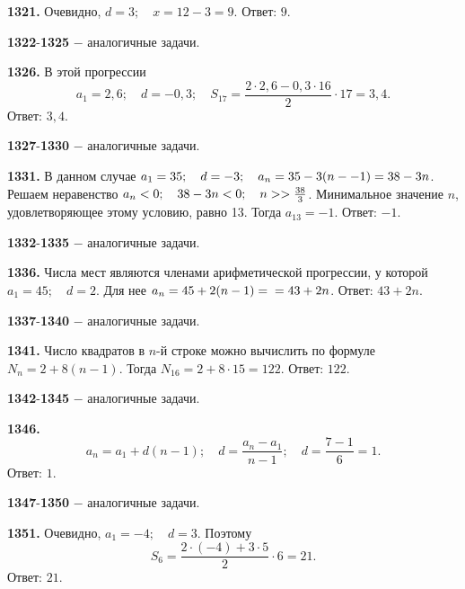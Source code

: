 \textbf{1321.} Очевидно, $d=3;\quad x=12-3=9$. \newline \null \hspace*{\fill} Ответ: $9$. 

\textbf{1322}-\textbf{1325} $-$ аналогичные задачи.

\textbf{1326.} В этой прогрессии $$a_1=2,6;\quad d=-0,3;\quad S_{17}=\frac{2\cdot2,6-0,3\cdot16}{2}\cdot17=3,4.$$ \newline \null \hspace*{\fill} Ответ: $3,4$. 

\textbf{1327}-\textbf{1330} $-$ аналогичные задачи.

\textbf{1331.} В данном случае $a_1=35;\quad d=-3;\quad a_n=35-3(n-\linebreak-1)=38-3n$. Решаем неравенство $a_n<0;\quad38-3n<0;\quad n>\linebreak>\frac{38}{3}$.  Минимальное 
значение $n$, удовлетворяющее этому условию, равно 13. Тогда $a_{13}=-1$. \newline \null \hspace*{\fill} Ответ: $-1$. 

\textbf{1332}-\textbf{1335} $-$ аналогичные задачи.

\textbf{1336.} Числа мест являются членами арифметической прогрессии, у которой $a_1=45;\quad d=2$. Для нее $a_n=45+2(n-1)=\newline=43+2n$. \newline \null \hspace*{\fill} Ответ: $43+2n$. 

\textbf{1337}-\textbf{1340} $-$ аналогичные задачи.

\textbf{1341.}  Число квадратов в  $n$-й строке можно вычислить по формуле $N_n=2+8(n-1)$. Тогда $N_{16}=2+8\cdot15=122$. \newline \null \hspace*{\fill} Ответ: $122$.

\textbf{1342}-\textbf{1345} $-$ аналогичные задачи.

\newpage \textbf{1346.} $$a_n=a_1+d(n-1);\quad d=\frac{a_n-a_1}{n-1};\quad d=\frac{7-1}{6}=1.$$ \newline \null \hspace*{\fill} Ответ: $1$.

\textbf{1347}-\textbf{1350} $-$ аналогичные задачи.

\textbf{1351.} Очевидно, $a_1=-4;\quad d=3$. Поэтому $$S_6=\frac{2\cdot(-4)+3\cdot5}{2}\cdot6=21.$$ \newline \null \hspace*{\fill} Ответ: $21$.

